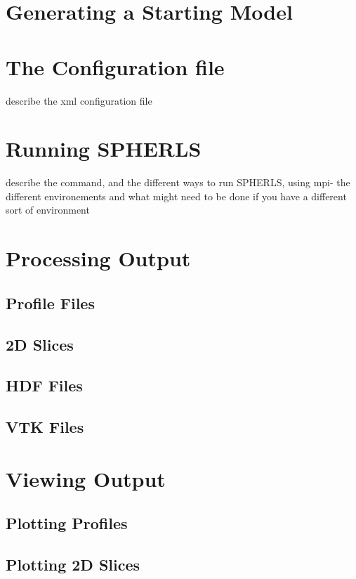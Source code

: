 \documentclass[12pt,a4paper]{book}
\begin{document}
\section{Generating a Starting Model}
\section{The Configuration file}
\label{sec:conf-file}
describe the xml configuration file
\section{Running SPHERLS}

describe the command, and the different ways to run SPHERLS, using mpi- the different environements and what might need to be done if you have a different sort of environment
\section{Processing Output}
\subsection{Profile Files}
\subsection{2D Slices}
\subsection{HDF Files}
\subsection{VTK Files}
\section{Viewing Output}
\subsection{Plotting Profiles}
\subsection{Plotting 2D Slices}
\end{document}
